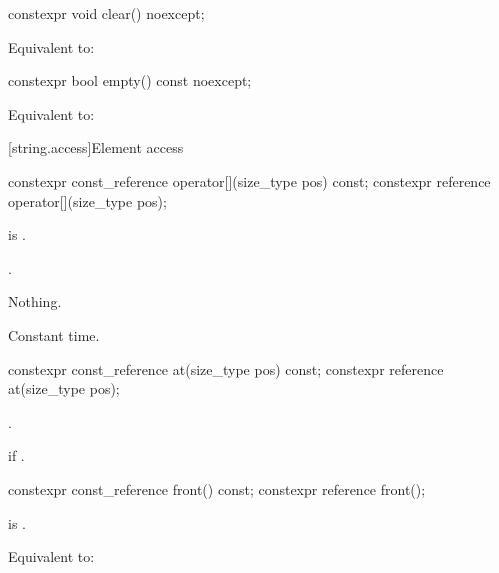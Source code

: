 %
\begin{itemdecl}
constexpr void clear() noexcept;
\end{itemdecl}

\begin{itemdescr}
\pnum
\effects
Equivalent to: 
\end{itemdescr}

%
\begin{itemdecl}
constexpr bool empty() const noexcept;
\end{itemdecl}

\begin{itemdescr}
\pnum
\effects
Equivalent to:
\end{itemdescr}

[string.access]{Element access}

%
\begin{itemdecl}
constexpr const_reference operator[](size_type pos) const;
constexpr reference       operator[](size_type pos);
\end{itemdecl}

\begin{itemdescr}
\pnum
\hardexpects
{} is .

\pnum
\returns
{}.

\pnum
\throws
Nothing.

\pnum
\complexity
Constant time.
\end{itemdescr}

%
\begin{itemdecl}
constexpr const_reference at(size_type pos) const;
constexpr reference       at(size_type pos);
\end{itemdecl}

\begin{itemdescr}
\pnum
\returns
{}.

\pnum
\throws
{}
if
.
\end{itemdescr}

%
\begin{itemdecl}
constexpr const_reference front() const;
constexpr reference front();
\end{itemdecl}

\begin{itemdescr}
\pnum
\hardexpects
{} is .

\pnum
\effects
Equivalent to: 
\end{itemdescr}

